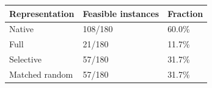 \begin{tabular}{lll}
\hline
Representation & Feasible instances & Fraction \\
\hline
Native & 108/180 & 60.0\% \\
Full & 21/180 & 11.7\% \\
Selective & 57/180 & 31.7\% \\
Matched random & 57/180 & 31.7\% \\
\hline
\end{tabular}

